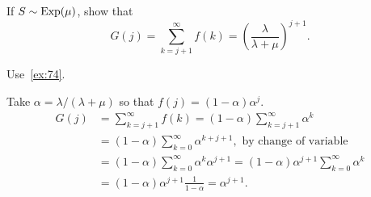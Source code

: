 \documentclass[companion]{subfiles}
\begin{document}
\begin{exercise}
 If $S\sim \operatorname{Exp}(\mu)$, show that 
 \begin{equation}
G(j) = \sum_{k=j+1}^\infty f(k) = \left(\frac{\lambda}{\lambda+\mu}\right)^{j+1}.
 \end{equation}
\begin{hint}
 Use~\cref{ex:74}.
\end{hint}
\begin{solution}
 Take $\alpha = \lambda/(\lambda+\mu)$ so that
 $f(j) = (1-\alpha) \alpha^j$.
\begin{align*}
 G(j) 
&= \sum_{k=j+1}^\infty f(k) = (1-\alpha) \sum_{k=j+1}^\infty \alpha^k \\
& = (1-\alpha) \sum_{k=0}^\infty \alpha^{k+j+1}, \text{ by change of variable}\\
& = (1-\alpha) \sum_{k=0}^\infty \alpha^{k}\alpha^{j+1}= (1-\alpha)\alpha^{j+1} \sum_{k=0}^\infty \alpha^k \\
&= (1-\alpha)\alpha^{j+1} \frac{1}{1-\alpha} = \alpha^{j+1}.
\end{align*}
\end{solution}
\end{exercise}
\end{document}
